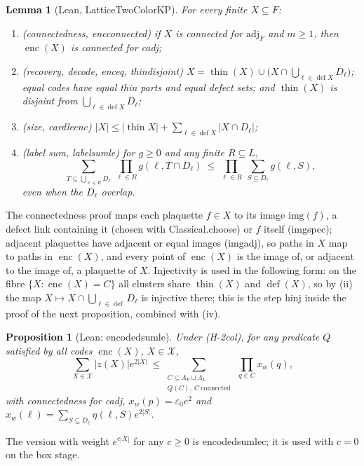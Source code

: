 \documentclass[11pt,a4paper]{article}
\newtheorem{lemma}[theorem]{Lemma}
\newtheorem{proposition}[theorem]{Proposition}
\theoremstyle{definition}
\theoremstyle{remark}
\DeclareRobustCommand{\lean}[1]{{\ttfamily\renewcommand{\_}{\textunderscore\allowbreak}#1}}
\newcommand{\thin}{\operatorname{thin}}
\newcommand{\dfc}{\operatorname{def}}
\newcommand{\enc}{\operatorname{enc}}
\begin{document}
\begin{lemma}[Lean, \lean{LatticeTwoColorKP}]\label{lem:enc}
For every finite $X\subseteq F$:
\begin{enumerate}[label=(\roman*),leftmargin=2em]
\item (\emph{connectedness}, \lean{enc\_connected}) if $X$ is connected for $\mathrm{adj}_F$ and $m\ge1$, then $\enc(X)$ is connected for \lean{cadj};
\item (\emph{recovery}, \lean{decode}, \lean{enc\_eq}, \lean{thin\_disjoint}) $X=\thin(X)\cup\bigl(X\cap\bigcup_{\ell\in\dfc X}D_\ell\bigr)$; equal codes have equal thin parts and equal defect sets; and $\thin(X)$ is disjoint from $\bigcup_{\ell\in\dfc X}D_\ell$;
\item (\emph{size}, \lean{card\_le\_enc}) $|X|\le|\thin X|+\sum_{\ell\in\dfc X}|X\cap D_\ell|$;
\item (\emph{label sum}, \lean{label\_sum\_le}) for $g\ge0$ and any finite $R\subseteq L$,
\[
\sum_{T\subseteq\bigcup_{\ell\in R}D_\ell}\ \prod_{\ell\in R}g(\ell,T\cap D_\ell)\ \le\ \prod_{\ell\in R}\ \sum_{S\subseteq D_\ell}g(\ell,S),
\]
even when the $D_\ell$ overlap.
\end{enumerate}
\end{lemma}

The connectedness proof maps each plaquette $f\in X$ to its image $\mathrm{img}(f)$, a defect link containing it (chosen with \lean{Classical.choose}) or $f$ itself (\lean{img\_spec}); adjacent plaquettes have adjacent or equal images (\lean{img\_adj}), so paths in $X$ map to paths in $\enc(X)$, and every point of $\enc(X)$ is the image of, or adjacent to the image of, a plaquette of $X$. Injectivity is used in the following form: on the fibre $\{X:\enc(X)=C\}$ all clusters share $\thin(X)$ and $\dfc(X)$, so by (ii) the map $X\mapsto X\cap\bigcup_{\ell\in\dfc}D_\ell$ is injective there; this is the step \lean{hinj} inside the proof of the next proposition, combined with (iv).

\begin{proposition}[Lean: \lean{encoded\_sum\_le}]\label{prop:encsum}
Under (H-2col), for any predicate $Q$ satisfied by all codes $\enc(X)$, $X\in\mathcal X$,
\[
\sum_{X\in\mathcal X}|z(X)|e^{2|X|}\ \le \sum_{\substack{C\subseteq\Lambda_F\sqcup\Lambda_L\\ Q(C),\ C\ \text{connected}}}\ \prod_{q\in C}x_w(q),
\]
with connectedness for \lean{cadj}, $x_w(p)=\varepsilon_0e^2$ and $x_w(\ell)=\sum_{S\subseteq D_\ell}\eta(\ell,S)e^{2|S|}$.
\end{proposition}
The version with weight $e^{c|X|}$ for any $c\ge0$ is \lean{encoded\_sum\_le\_c}; it is used with $c=0$ on the box stage.
\end{document}
